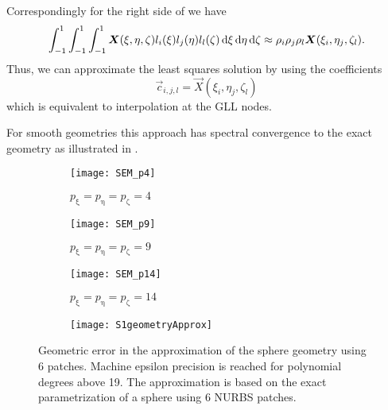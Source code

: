 Correspondingly for the right side of  we have
\begin{equation*}
	\int_{-1}^1\int_{-1}^1\int_{-1}^1 \vec{X}(\xi,\eta,\zeta)l_i(\xi)l_j(\eta)l_l(\zeta)\idiff\xi\idiff\eta\idiff\zeta \approx \rho_i\rho_j\rho_l \vec{X}(\xi_i,\eta_j,\zeta_l).
\end{equation*}
Thus, we can approximate the least squares solution by using the coefficients
\begin{equation*}
	\vec{c}_{i,j,l} = \vec{X}(\xi_i,\eta_j,\zeta_l)
\end{equation*}
which is equivalent to interpolation at the GLL nodes.

For smooth geometries this approach has spectral convergence to the exact geometry as illustrated in .
\begin{figure}
	\centering
	\begin{subfigure}[t]{0.28\textwidth}
		\centering
		\texttt{[image: SEM\_p4]}
		\caption{$p_\upxi=p_\upeta=p_\upzeta=4$}
	\end{subfigure}%
	\hspace*{0.01\textwidth}%
	\begin{subfigure}[t]{0.28\textwidth}
		\centering
		\texttt{[image: SEM\_p9]}
		\caption{$p_\upxi=p_\upeta=p_\upzeta=9$}
	\end{subfigure}%
	\hspace*{0.01\textwidth}%
	\begin{subfigure}[t]{0.28\textwidth}
		\centering
		\texttt{[image: SEM\_p14]}
		\caption{$p_\upxi=p_\upeta=p_\upzeta=14$}
	\end{subfigure}%
	\hspace*{0.01\textwidth}%
	\begin{subfigure}[t]{0.1\textwidth}
		\centering
		\texttt{[image: S1geometryApprox]}
	\end{subfigure}
	\caption{Geometric error in the approximation of the sphere geometry using 6 patches. Machine epsilon precision is reached for polynomial degrees above 19. The approximation is based on the exact parametrization of a sphere using 6 NURBS patches.}
	\label{Fig5:spectralGeomteryApprox}
\end{figure}